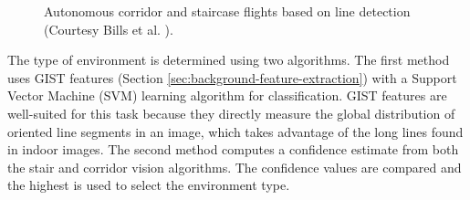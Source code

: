 \begin{figure}[htb!]
  \begin{center}
\hspace{1cm}
   
  \end{center}
  \caption{Autonomous corridor and staircase flights based on line detection (Courtesy Bills et al. \cite{Bills2011icra}).}
  \label{featureImg}
\end{figure}

The type of environment is determined using two algorithms.
The first method uses GIST features \cite{oliva2001modeling} (Section \ref{sec:background-feature-extraction}) with a Support Vector Machine (SVM) learning algorithm for classification.
GIST features are well-suited for this task because they directly measure the global distribution of oriented line segments in an image, which takes advantage of the long lines found in indoor images.
The second method computes a confidence estimate from both the stair and corridor vision algorithms.
The confidence values are compared and the highest is used to select the environment type.

